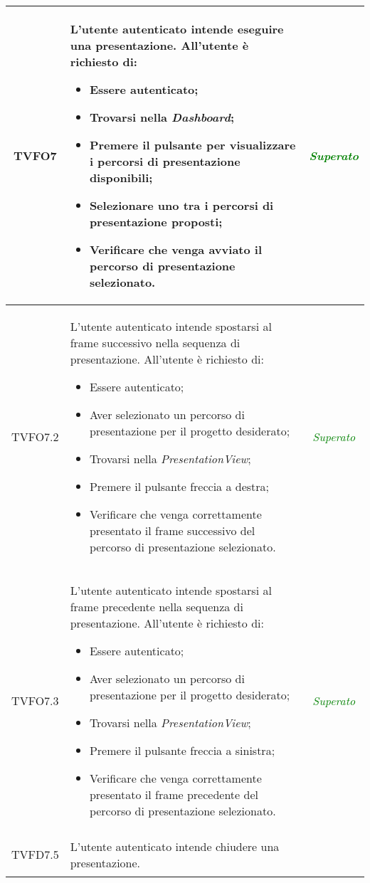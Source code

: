 \begin{longtable}{|c|>{}m{8cm}|c|}
\hypertarget{TVFO7}{TVFO7} & L'utente autenticato intende eseguire una presentazione.
All'utente è richiesto di:
\begin{itemize}
	\item Essere autenticato;
	\item Trovarsi nella \textit{Dashboard};
	\item Premere il pulsante per visualizzare i percorsi di presentazione disponibili;
	\item Selezionare uno tra i percorsi di presentazione proposti;
	\item Verificare che venga avviato il percorso di presentazione selezionato.
\end{itemize} & \textcolor{Green}{\textit{Superato}}\\ \hline
\hypertarget{TVFO7.2}{TVFO7.2} & L'utente autenticato intende spostarsi al frame successivo nella sequenza di presentazione.
All'utente è richiesto di:
\begin{itemize}
	\item Essere autenticato;
	\item Aver selezionato un percorso di presentazione per il progetto desiderato;
	\item Trovarsi nella \textit{PresentationView};
	\item Premere il pulsante freccia a destra;
	\item Verificare che venga correttamente presentato il frame successivo del percorso di presentazione selezionato.
\end{itemize} & \textcolor{Green}{\textit{Superato}}\\ \hline
\hypertarget{TVFO7.3}{TVFO7.3} & L'utente autenticato intende spostarsi al frame precedente nella sequenza di presentazione.
All'utente è richiesto di:
\begin{itemize}
	\item Essere autenticato;
	\item Aver selezionato un percorso di presentazione per il progetto desiderato;
	\item Trovarsi nella \textit{PresentationView};
	\item Premere il pulsante freccia a sinistra;
	\item Verificare che venga correttamente presentato il frame precedente del percorso di presentazione selezionato.
\end{itemize} & \textcolor{Green}{\textit{Superato}}\\ \hline
\hypertarget{TVFD7.5}{TVFD7.5} & L'utente autenticato intende chiudere una presentazione.

\end{longtable}
